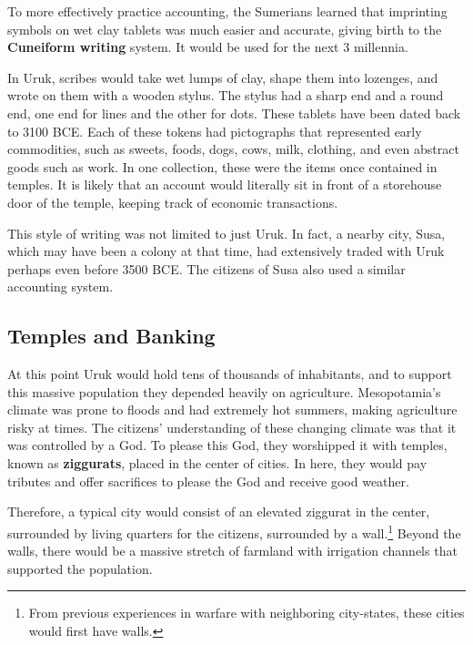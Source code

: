 \documentclass{article}
\begin{document}
    \begin{finance}[Writing]
      To more effectively practice accounting, the Sumerians learned that imprinting symbols on wet clay tablets was much easier and accurate, giving birth to the \textbf{Cuneiform writing} system. It would be used for the next 3 millennia. 
    \end{finance}

    In Uruk, scribes would take wet lumps of clay, shape them into lozenges, and wrote on them with a wooden stylus. The stylus had a sharp end and a round end, one end for lines and the other for dots. These tablets have been dated back to 3100 BCE. Each of these tokens had pictographs that represented early commodities, such as sweets, foods, dogs, cows, milk, clothing, and even abstract goods such as work. In one collection, these were the items once contained in temples. It is likely that an account would literally sit in front of a storehouse door of the temple, keeping track of economic transactions. 

    This style of writing was not limited to just Uruk. In fact, a nearby city, Susa, which may have been a colony at that time, had extensively traded with Uruk perhaps even before 3500 BCE. The citizens of Susa also used a similar accounting system. 

  \subsection{Temples and Banking}

    \begin{religion}
      At this point Uruk would hold tens of thousands of inhabitants, and to support this massive population they depended heavily on agriculture. Mesopotamia's climate was prone to floods and had extremely hot summers, making agriculture risky at times. The citizens' understanding of these changing climate was that it was controlled by a God. To please this God, they worshipped it with temples, known as \textbf{ziggurats}, placed in the center of cities. In here, they would pay tributes and offer sacrifices to please the God and receive good weather. 
    \end{religion}
    
    Therefore, a typical city would consist of an elevated ziggurat in the center, surrounded by living quarters for the citizens, surrounded by a wall.\footnote{From previous experiences in warfare with neighboring city-states, these cities would first have walls. } Beyond the walls, there would be a massive stretch of farmland with irrigation channels that supported the population.
\end{document}
